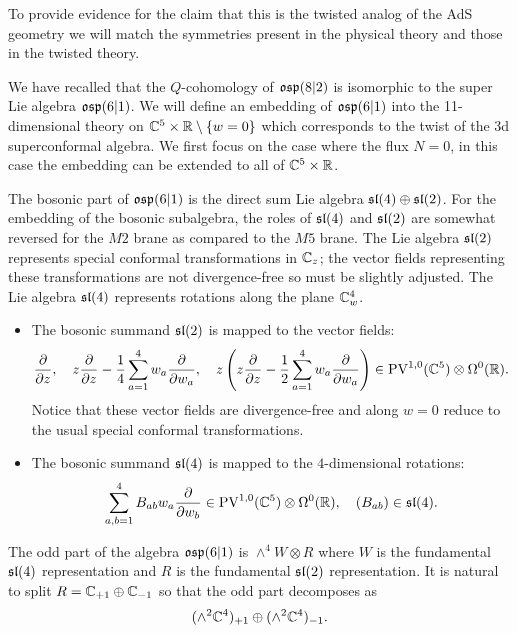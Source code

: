 \parsec[]

To provide evidence for the claim that this is the twisted analog of the AdS geometry we will match the symmetries present in the physical theory and those in the twisted theory. 

We have recalled that the $Q$-cohomology of $\mathfrak{osp}(8|2)$ is isomorphic to the super Lie algebra $\mathfrak{osp}(6|1)$. 
We will define an embedding of $\mathfrak{osp}(6|1)$ into the 11-dimensional theory on $\mathbb C^5 \times \mathbb R \setminus \{w=0\}$ which corresponds to the twist of the 3d superconformal algebra.
We first focus on the case where the flux $N=0$, in this case the embedding can be extended to all of $\mathbb C^5 \times \mathbb R$. 

\parsec[] 

The bosonic part of $\mathfrak{osp}(6|1)$ is the direct sum Lie algebra $\mathfrak{sl}(4) \oplus \mathfrak{sl}(2)$. 
For the embedding of the bosonic subalgebra, the roles of $\mathfrak{sl}(4)$ and $\mathfrak{sl}(2)$ are somewhat reversed for the $M2$ brane as compared to the $M5$ brane. 
The Lie algebra $\mathfrak{sl}(2)$ represents special conformal transformations in $\mathbb C_z$; the vector fields representing these transformations are not divergence-free so must be slightly adjusted. 
The Lie algebra $\mathfrak{sl}(4)$ represents rotations along the plane $\mathbb C^4_w$.   

\begin{itemize}
\item The bosonic summand $\mathfrak{sl}(2)$ is mapped to the vector fields:
\[
\frac{\partial}{\partial z} ,\quad z \frac{\partial}{\partial z} - \frac14 \sum_{a=1}^4 w_a \frac{\partial}{\partial w_a} , \quad z \left(z \frac{\partial}{\partial z} - \frac12 \sum_{a=1}^4 w_a \frac{\partial}{\partial w_a} \right) \in {\rm PV}^{1,0}(\mathbb C^5) \otimes \Omega^0(\mathbb R) .
\]
Notice that these vector fields are divergence-free and along $w=0$ reduce to the usual special conformal transformations.
\item The bosonic summand $\mathfrak{sl}(4)$ is mapped to the $4$-dimensional rotations: 
\[
\sum_{a,b=1}^4 B_{ab} w_a \frac{\partial}{\partial w_b} \in {\rm PV}^{1,0}(\mathbb C^5) \otimes \Omega^0(\mathbb R) , \quad (B_{ab}) \in \mathfrak{sl}(4) .
\]
\end{itemize}

The odd part of the algebra $\mathfrak{osp}(6|1)$ is $\wedge^4 W \otimes R$ where $W$ is the fundamental $\mathfrak{sl}(4)$ representation and $R$ is the fundamental $\mathfrak{sl}(2)$ representation. 
It is natural to split $R = \mathbb C_{+1} \oplus \mathbb C_{-1}$ so that the odd part decomposes as
\[
(\wedge^2 \mathbb C^4)_{+1} \oplus (\wedge^2 \mathbb C^4)_{-1} .
\]

